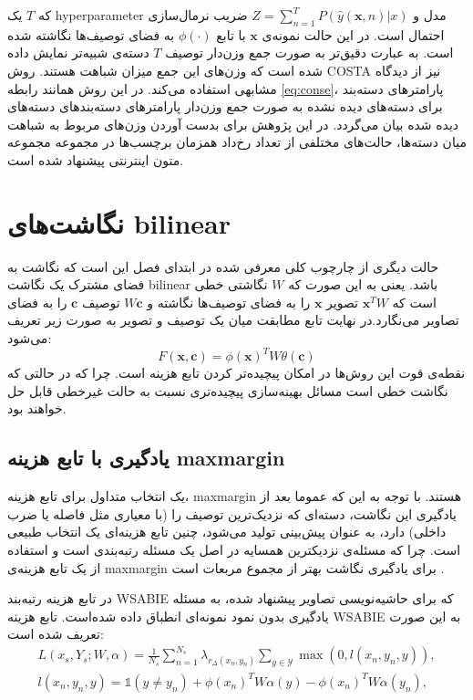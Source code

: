  که $T$ یک \gls{hyperparameter} مدل و
 $Z = \sum_{n=1}^T P(\hat{y}(\mathbf{x},n) | x) $
 ضریب نرمال‌سازی احتمال است. در این حالت نمونه‌ی $\mathbf{x}$ با تابع $\phi(\cdot)$ به فضای توصیف‌ها نگاشته شده است. به عبارت دقیق‌تر به صورت جمع وزن‌دار توصیف $T$ دسته‌ی شبیه‌تر نمایش داده شده است که وزن‌های این جمع میزان شباهت هستند. 
 روش \gls{COSTA}
 \cite{costa}
 نیز از دیدگاه مشابهی استفاده می‌کند. در این روش همانند رابطه \eqref{eq:conse}، پارامترهای دسته‌بند برای دسته‌های دیده نشده به صورت جمع وزن‌دار پارامترهای دسته‌بندهای دسته‌های دیده شده بیان می‌گردد. در این پژوهش برای بدست آوردن وزن‌های مربوط به شباهت میان دسته‌ها، حالت‌های مختلفی از تعداد رخ‌داد همزمان برچسب‌ها در مجموعه مجموعه متون اینترنتی  پیشنهاد شده است.




\section{نگاشت‌های \gls{bilinear}}
حالت دیگری از چارچوب کلی معرفی شده در ابتدای فصل این است که نگاشت به فضای مشترک یک نگاشت \gls{bilinear} باشد. یعنی به این صورت که $W$ نگاشتی خطی است که $\mathbf{x} ^TW$ تصویر $\mathbf{x} $ را به فضای توصیف‌ها نگاشته و $W\mathbf{c} $ توصیف $\mathbf{c} $ را به فضای تصاویر می‌نگارد.در نهایت تابع مطابقت میان یک توصیف و تصویر به صورت زیر تعریف می‌شود:
\begin{equation}\label{bilinear}
F(\mathbf{x,c} ) = \phi(\mathbf{x} )^TW \theta(\mathbf{c} )
\end{equation}
  نقطه‌ی قوت این روش‌ها در امکان پیچیده‌تر کردن تابع هزینه است. چرا که در حالتی که نگاشت خطی است مسائل بهینه‌سازی پیچیده‌تری نسبت به حالت غیرخطی قابل حل خواهند بود.

 \subsection{یادگیری با تابع هزینه \gls{maxmargin}}
  یک انتخاب متداول برای تابع هزینه، \gls{maxmargin}
هستند. با توجه به این که عموما بعد از یادگیری این نگاشت، دسته‌ای که نزدیک‌ترین توصیف را (با معیاری مثل فاصله یا ضرب داخلی) دارد، به عنوان پیش‌بینی تولید می‌شود،
 چنین تابع هزینه‌ای یک انتخاب طبیعی است. چرا که مسئله‌ی نزدیکترین همسایه در اصل یک مسئله رتبه‌بندی
 است و استفاده از یک تابع هزینه‌ی \gls{maxmargin} برای یادگیری نگاشت بهتر از مجموع مربعات است \cite{devise}.

در
\cite{akata2013}
 تابع هزینه رتبه‌بند WSABIE
\cite{wsabie}
که برای حاشیه‌نویسی تصاویر پیشنهاد شده، به مسئله یادگیری بدون نمود نمونه‌ای انطباق داده شده‌است.
تابع هزینه WSABIE به این صورت تعریف شده است:
\begin{align}
L(x_s, Y_s ; W, \alpha) = \frac{1}{N_s} \sum_{n=1}^{N_s} \lambda_{r_\Delta (x_n, y_n)} \sum_{y \in \mathcal{Y}} \max (0, \mathit{l}(x_n, y_n, y) ), \\
\mathit{l}(x_n,y_n,y) = \mathds{1}(y \neq y_n) + \phi(x_n)^TW \alpha(y) - \phi(x_n)^TW\alpha(y_n), \label{l_loss}
\end{align}

